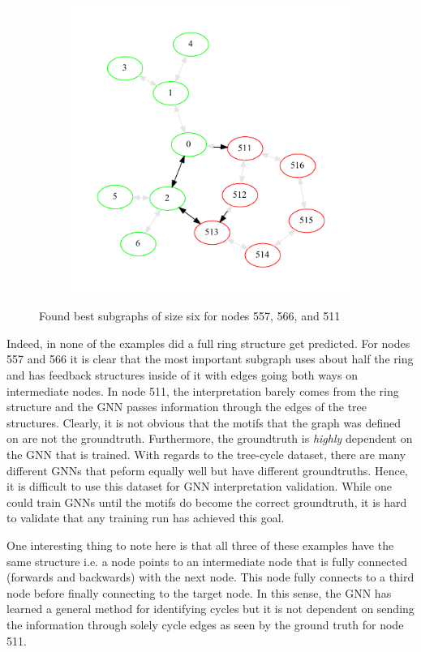 \begin{figure}[H]
\begin{subfigure}{0.49\textwidth}
		\includegraphics[width=0.95\linewidth]{images/tree-cycles-511.pdf}
	\end{subfigure}
	\caption{Found best subgraphs of size six for nodes 557, 566, and 511}
	\label{fig:tree-cycles-gt}
\end{figure}

Indeed, in none of the examples did a full ring structure get predicted. For nodes 557 and 566 it is clear that the most important subgraph uses about half the ring and has feedback structures inside of it with edges going both ways on intermediate nodes. In node 511, the interpretation barely comes from the ring structure and the GNN passes information through the edges of the tree structures. Clearly, it is not obvious that the motifs that the graph was defined on are not the groundtruth. Furthermore, the groundtruth is \textit{highly} dependent on the GNN that is trained. With regards to the tree-cycle dataset, there are many different GNNs that peform equally well but have different groundtruths. Hence, it is difficult to use this dataset for GNN interpretation validation. While one could train GNNs until the motifs do become the correct groundtruth, it is hard to validate that any training run has achieved this goal.

One interesting thing to note here is that all three of these examples have the same structure i.e. a node points to an intermediate node that is fully connected (forwards and backwards) with the next node. This node fully connects to a third node before finally connecting to the target node. In this sense, the GNN has learned a general method for identifying cycles but it is not dependent on sending the information through solely cycle edges as seen by the ground truth for node 511.

